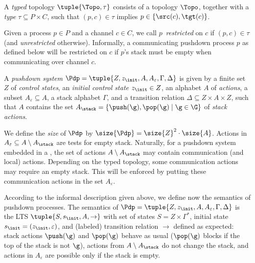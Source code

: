 \documentclass{LMCS}
\newenvironment{definition}{\begin{defi}}{\end{defi}}
\begin{document}
\begin{definition}
  A \emph{typed} topology $\tuple{\Topo,\tau}$ consists of a topology
  $\Topo$, together with a \emph{type} $\tau \subseteq P \times C$, such that $(p,c)
  \in\tau$ implies $p \in \{\src(c),\tgt(c)\}$.
\label{def:oriented}
\end{definition}

Given a process $p \in P$ and a channel $c \in C$, we call
$p$~\emph{restricted} on $c$ if $(p,c) \in \tau$ (and
\emph{unrestricted} otherwise). Informally, a communicating pushdown
process $p$ as defined below will be restricted on $c$ if $p$'s stack
must be empty when communicating over channel $c$.
































\begin{definition} 
  A \emph{pushdown system} $\Pdp = \tuple{Z, z_\init, A,
    A_\varepsilon,\Gamma, \Delta}$ is given by a finite set $Z$ of
  \emph{control states}, an \emph{initial control state} $z_\init \in
  Z$, an alphabet $A$ of \emph{actions},
  a subset $A_\varepsilon \subseteq A$,
  a stack alphabet $\Gamma$, and
  a transition relation $\Delta \subseteq Z \times A \times Z$, such that
  $A$ contains the set $A_\stack = \{\push(\g),\pop(\g) \mid \g \in \G\}$
  of \emph{stack actions}.
\end{definition}
We define the \emph{size} of $\Pdp$ by $\size{\Pdp} = \size{Z}^2 \cdot
\size{A}$.
Actions in $A_\varepsilon \subseteq A \setminus A_\stack$ are tests for
empty stack.
Naturally, for a pushdown system embedded in a \qcp, the set of actions
$A \setminus A_\stack$ may contain communication (and local) actions.
Depending on the typed topology, some communication actions
may require an empty stack.  This will be enforced by putting these
communication actions in the set $A_\varepsilon$.

According to the informal description given above, we define now the
semantics of pushdown processes.
The semantics of $\Pdp = \tuple{Z, z_\init, A, A_\varepsilon,\Gamma, \Delta}$
is the LTS $\tuple{S,s_\init,A,\rightarrow}$ with set of states
$S=Z \times \Gamma^*$, initial state $s_\init = (z_\init, \varepsilon)$,
and (labeled) transition relation $\rightarrow$ defined as expected:
stack actions $\push(\g)$ and $\pop(\g)$ behave as usual ($\pop(\g)$ blocks
if the top of the stack is not $\g$), actions from $A \setminus A_\stack$
do not change the stack, and actions in $A_\varepsilon$ are possible only if
the stack is empty.
\end{document}
